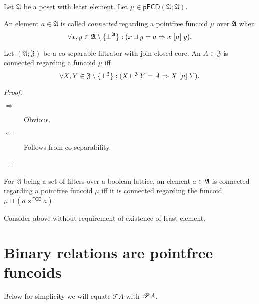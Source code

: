 Let $\mathfrak{A}$ be a poset with least element. Let $\mu\in\mathsf{pFCD}(\mathfrak{A};\mathfrak{A})$.
\begin{defn}
An element $a\in\mathfrak{A}$
is called \emph{connected} regarding a pointfree funcoid $\mu$ over
$\mathfrak{A}$ when 
\[
\forall x,y\in\mathfrak{A}\setminus\{\bot^{\mathfrak{A}}\}:(x\sqcup y=a\Rightarrow x\mathrel{\left[\mu\right]}y).
\]
\end{defn}
\begin{prop}
Let $(\mathfrak{A};\mathfrak{Z})$ be a co-separable filtrator with
join-closed core. An $A\in\mathfrak{Z}$ is connected regarding a
funcoid $\mu$ iff 
\[
\forall X,Y\in\mathfrak{Z}\setminus\{\bot^{\mathfrak{Z}}\}:(X\sqcup^{\mathfrak{Z}}Y=A\Rightarrow X\mathrel{\left[\mu\right]}Y).
\]
\end{prop}
\begin{proof}
~
\begin{description}
\item [{$\Rightarrow$}] Obvious.
\item [{$\Leftarrow$}] Follows from co-separability.
\end{description}
\end{proof}
\begin{obvious}
For $\mathfrak{A}$ being a set of filters over a boolean lattice,
an element $a\in\mathfrak{A}$ is connected regarding a pointfree
funcoid $\mu$ iff it is connected regarding the funcoid $\mu\sqcap(a\times^{\mathsf{FCD}}a)$.\end{obvious}
\begin{xca}
Consider above without requirement of existence of least element.
\end{xca}

\section{Binary relations are pointfree funcoids}

Below for simplicity we will equate $\mathscr{T}A$ with $\mathscr{P} A$.

